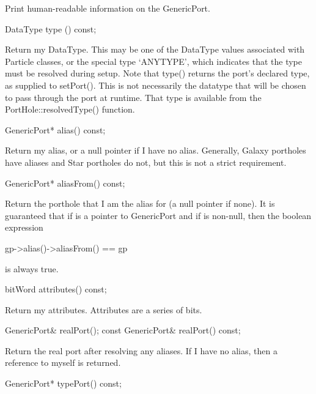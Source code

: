 Print human-readable information on the GenericPort.

\begin{example}
DataType type () const;
\end{example}

Return my DataType.  This may be one of the DataType values associated
with Particle classes, or the special type `ANYTYPE', which indicates
that the type must be resolved during setup.  Note that type() returns
the port's declared type, as supplied to setPort().  This is not
necessarily the datatype that will be chosen to pass through the port at
runtime.  That type is available from the PortHole::resolvedType()
function.

\begin{example}
GenericPort* alias() const;
\end{example}

Return my alias, or a null pointer if I have no alias.  Generally,
Galaxy portholes have aliases and Star portholes do not, but this
is not a strict requirement.

\begin{example}
GenericPort* aliasFrom() const;
\end{example}

Return the porthole that I am the alias for (a null pointer if none).
It is guaranteed that if  is a pointer to GenericPort and if
 is non-null, then the boolean expression

\begin{example}
gp->alias()->aliasFrom() == gp
\end{example}

is always true.

\begin{example}
bitWord attributes() const;
\end{example}

Return my attributes.  Attributes are a series of bits.

\begin{example}
GenericPort& realPort();
const GenericPort& realPort() const;
\end{example}

Return the real port after resolving any aliases.  If I have no alias,
then a reference to myself is returned.

\begin{example}
GenericPort* typePort() const;
\end{example}

